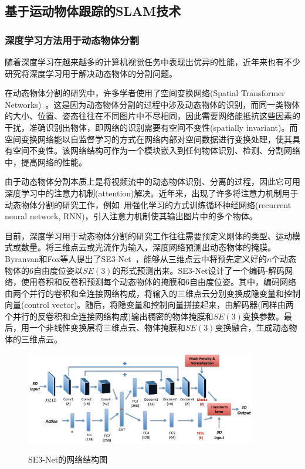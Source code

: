 \subsection{基于运动物体跟踪的SLAM技术}
\label{subsec:object_tracking}

\subsubsection{深度学习方法用于动态物体分割}
\newpage
随着深度学习在越来越多的计算机视觉任务中表现出优异的性能，近年来也有不少研究将深度学习用于解决动态物体的分割问题。

在动态物体分割的研究中，许多学者使用了空间变换网络(Spatial Transformer Networks)~\cite{2015spatial}。这是因为动态物体分割的过程中涉及动态物体的识别，而同一类物体的大小、位置、姿态往往在不同图片中不尽相同，因此需要网络能抵抗这些因素的干扰，准确识别出物体，即网络的识别需要有空间不变性(spatially invariant)。而空间变换网络能以自监督学习的方式在网络内部对空间数据进行变换处理，使其具有空间不变性。该网络结构可作为一个模块嵌入到任何物体识别、检测、分割网络中，提高网络的性能。

由于动态物体分割本质上是将视频流中的动态物体识别、分离的过程，因此它可用深度学习中的注意力机制(attention)解决。近年来，出现了许多将注意力机制用于动态物体分割的研究工作，例如~\cite{2014multiple}用强化学习的方式训练循环神经网络(recurrent neural network, RNN)，引入注意力机制使其输出图片中的多个物体。

目前，深度学习用于动态物体分割的研究工作往往需要预定义刚体的类型、运动模式或数量。将三维点云或光流作为输入，深度网络预测出动态物体的掩膜。Byranvan和Fox等人提出了SE3-Net~\cite{se3}，能够从三维点云中将预先定义好的$n$个动态物体的6自由度位姿以$SE(3)$的形式预测出来。SE3-Net设计了一个编码-解码网络，使用卷积和反卷积预测每个动态物体的掩膜和6自由度位姿。其中，编码网络由两个并行的卷积和全连接网络构成，将输入的三维点云分别变换成隐变量和控制向量(control vector)。随后，将隐变量和控制向量拼接起来，由解码器(同样由两个并行的反卷积和全连接网络构成)输出稠密的物体掩膜和$SE(3)$变换参数。最后，用一个非线性变换层将三维点云、物体掩膜和$SE(3)$变换融合，生成动态物体的三维点云。

\begin{figure}[htbp]
	\centering
	\includegraphics[width=0.9\textwidth]{figs/1-2/se3-net.png} 
	\label{se3-net}
	\caption{SE3-Net的网络结构图}
\end{figure}

